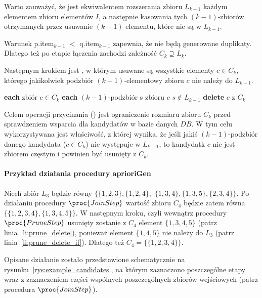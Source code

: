 Warto zauważyć, że  jest ekwiwalentem rozszerania zbioru $L_{k-1}$ każdym elementem zbioru elementów $I$, a następnie kasowania tych $(k-1)$-zbiorów otrzymanych przez usuwanie $(k-1)$ elementu, które nie są w $L_{k-1}$. 

Warunek p.item$_{k-1}$ $<$ q.item$_{k-1}$ zapewnia, że nie będą generowane duplikaty. Dlatego też po etapie łączenia zachodzi zależność $C_k \supseteq L_k$.

Następnym krokiem jest , w którym usuwane są wszystkie elementy $c \in C_k$, którego jakikolwiek podzbiór $(k-1)$-elementowy zbioru $c$ nie należy do $L_{k-1}$.

\begin{codebox}
		\li \For \textbf{each} zbiór $c \in C_k$ 
		\li \Do
			\li \For \textbf{each} $(k-1)$-podzbiór s zbioru $c$
					\li \Do 
						\If $s \notin L_{k-1}$ \label{li:prune_delete_if}
						\li \Then
							\textbf{delete} $c$ z $C_k$\label{li:prune_delete}
						\End
					\End
		\End
\end{codebox}

Celem operacji przycinania () jest ograniczenie rozmiaru zbioru $C_k$ przed sprawdzeniem wsparcia dla kandydatów w bazie danych $DB$. W tym celu wykorzystywana jest właściwość, z której wynika, że jeśli jakiś $(k-1)$-podzbiór danego kandydata ($c \in C_k$) nie występuje w $L_{k-1}$, to kandydatk $c$ nie jest zbiorem częstym i powinien być usunięty z $C_k$.

\paragraph{Przykład działania procedury aprioriGen}
Niech zbiór $L_3$ będzie równy $\lbrace \lbrace 1, 2, 3 \rbrace, \lbrace 1,2,4 \rbrace,$ $\lbrace 1,3,4 \rbrace, \lbrace 1, 3, 5 \rbrace, \lbrace 2, 3, 4 \rbrace \rbrace$. Po działaniu procedury $\proc{Join Step}$ wartość zbioru $C_4$ będzie zatem równa $\lbrace \lbrace 1, 2, 3, 4 \rbrace, \lbrace 1, 3, 4, 5 \rbrace \rbrace$. W następnym kroku, czyli wewnątrz procedury $\proc{Prune Step}$ usunięty zostanie z $C_4$ element $\lbrace 1, 3, 4, 5 \rbrace$ (patrz linia~\ref{li:prune_delete}), ponieważ element $\lbrace 1, 4, 5 \rbrace$ nie należy do $L_3$ (patrz linia~\ref{li:prune_delete_if}). Dlatego też $C_4 = \lbrace \lbrace 1, 2, 3, 4 \rbrace \rbrace$. 

Opisane działanie zostało przedstawione schematycznie na rysunku~\ref{rys:example_candidates}, na którym zaznaczono poszczególne etapy wraz z zaznaczeniem części wspólnych poszczególnych zbiorów wejściowych (patrz procedura $\proc{Join Step}$).

